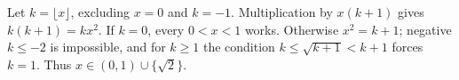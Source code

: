 Let $k=\lfloor x\rfloor$, excluding $x=0$ and $k=-1$. Multiplication by $x(k+1)$ gives $k(k+1)=kx^2$. If $k=0$, every $0<x<1$ works. Otherwise $x^2=k+1$; negative $k\le-2$ is impossible, and for $k\ge1$ the condition $k\le\sqrt{k+1}<k+1$ forces $k=1$. Thus $\boxed{x\in(0,1)\cup\{\sqrt2\}}$.
